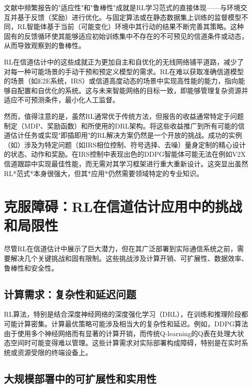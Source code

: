 \documentclass[journal]{IEEEtran}
\begin{document}
文献中频繁报告的"适应性"和"鲁棒性"成就是RL学习范式的直接体现——与环境交互并基于反馈（奖励）进行优化。与固定算法或在静态数据集上训练的监督模型不同，RL智能体基于当前（可能变化）环境中其行动的结果不断完善其策略\cite{ref1}。这种固有的反馈循环使其能够适应初始训练集中不存在的不可预见的信道条件或动态，从而导致观察到的鲁棒性\cite{ref1}。

RL在信道估计中的这些成就正为更加自主和自优化的无线网络铺平道路，减少了对每一种可能场景的手动干预和预定义模型的需求。RL在难以获取准确信道模型的场景（如E2E系统\cite{ref10}，IRS\cite{ref1}）或信道高度动态的场景\cite{ref12}中实现高性能的能力，指向能够自配置和自优化的系统。这与未来智能网络的目标一致，即能够管理复杂资源并适应不可预测条件，最小化人工监督。

然而，值得注意的是，虽然RL通常优于传统方法，但报告的收益通常特定于问题制定（MDP、奖励函数）和所使用的DRL架构。将这些收益推广到所有可能的信道估计任务或实现"即插即用"的RL解决方案仍然是一个开放的挑战。成功的实例（如\cite{ref1}）涉及为特定问题（如IRS相位控制、符号选择、去噪）量身定制的精心设计的状态、动作和奖励。在IRS控制中表现出色的DDPG智能体\cite{ref1}可能无法在例如V2X信道跟踪中实现最佳性能，而无需对其学习框架进行重大重新设计。这突显出虽然RL*范式*本身很强大，但其*应用*仍然需要领域特定的专业知识。

\section{克服障碍：RL在信道估计应用中的挑战和局限性}

尽管RL在信道估计中展示了巨大潜力，但在其广泛部署到实际通信系统之前，需要解决几个关键挑战和固有限制。这些挑战涉及计算开销、可扩展性、数据效率、鲁棒性和安全性。

\subsection{计算需求：复杂性和延迟问题}

RL算法，特别是结合深度神经网络的深度强化学习（DRL），在训练和推理阶段都可能计算密集\cite{ref7}。计算最优策略可能涉及相当大的复杂性和延迟\cite{ref12}。例如，DDPG算法由于使用多个神经网络而有显著的计算开销\cite{ref7}，而传统Q-learning的Q表在处理大状态空间时可能变得难以管理\cite{ref15}。这些计算需求对实际部署构成障碍，特别是在实时系统或资源受限的终端设备上\cite{ref11}。

\subsection{大规模部署中的可扩展性和实用性}
\end{document}
